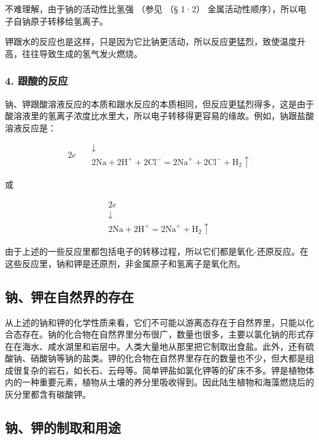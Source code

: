 不难理解，由于钠的活动性比氢强 （参见 （§ 1·2）
金属活动性顺序），所以电子自钠原子转移给氢离子。

钾跟水的反应也是这样，只是因为它比钠更活动，所以反应更猛烈，致使温度升高，往往导致生成的氢气发火燃烧。

\subsubsection{4. 跟酸的反应}

钠、钾跟酸溶液反应的本质和跟水反应的本质相同，但反应更猛烈得多，这是由于酸溶液里的氢离子浓度比水里大，所以电子转移得更容易的缘故。例如，钠跟盐酸溶液反应是：

\[
\begin{array}{c} 2 e \\ \hline {} \end{array} \quad \begin{array}{c} \downarrow \\ 2 \mathrm{Na} + 2 \mathrm{H} ^ {+} + 2 \mathrm{Cl} ^ {-} = 2 \mathrm{Na} ^ {+} + 2 \mathrm{Cl} ^ {-} + \mathrm{H} _ {2} \uparrow \end{array}
\]

或

\[
\begin{array}{c} 2 e \\ \downarrow \\ 2 \mathrm{Na} + 2 \mathrm{H} ^ {+} = 2 \mathrm{Na} ^ {+} + \mathrm{H} _ {2} \uparrow \end{array}
\]

由于上述的一些反应里都包括电子的转移过程，所以它们都是氧化-还原反应。在这些反应里，钠和钾是还原剂，非金属原子和氢离子是氧化剂。

\subsection{钠、钾在自然界的存在}

从上述的钠和钾的化学性质来看，它们不可能以游离态存在于自然界里，只能以化合态存在。钠的化合物在自然界里分布很广，数量也很多，主要以氯化钠的形式存在在海水、咸水湖里和岩层中。人类大量地从那里把它制取出食盐。此外，还有硫酸钠、硝酸钠等钠的盐类。钾的化合物在自然界里存在的数量也不少，但大都是组成很复杂的岩石，如长石、云母等。简单钾盐如氯化钾等的矿床不多。钾是植物体内的一种重要元素，植物从土壤的养分里吸收得到。因此陆生植物和海藻燃烧后的灰分里都含有碳酸钾。

\subsection{钠、钾的制取和用途}

